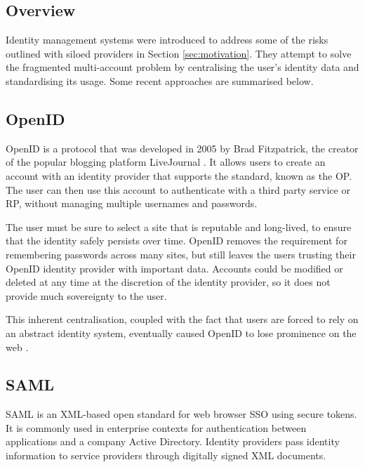 \subsection{Overview}
Identity management systems were introduced to address some of the risks outlined with siloed providers in Section \ref{sec:motivation}. They attempt to solve the fragmented multi-account problem by centralising the user's identity data and standardising its usage. Some recent approaches are summarised below.

\subsection{OpenID}
OpenID is a protocol that was developed in 2005 by Brad Fitzpatrick, the creator of the popular blogging platform LiveJournal \cite{fitzpatrick_distributed_2005}.
It allows users to create an account with an identity provider that supports the standard, known as the \ac{OP}. The user can then use this account to authenticate with a third party service or \ac{RP}, without managing multiple usernames and passwords.

The user must be sure to select a site that is reputable and long-lived, to ensure that the identity safely persists over time. OpenID removes the requirement for remembering passwords across many sites, but still leaves the users trusting their OpenID identity provider with important data. Accounts could be modified or deleted at any time at the discretion of the identity provider, so it does not provide much sovereignty to the user.

This inherent centralisation, coupled with the fact that users are forced to rely on an abstract identity system, eventually caused OpenID to lose prominence on the web \cite{gilbertson_openid:_2011}.

\subsection{SAML}
\ac{SAML} \cite{oasis_security_services_saml_2005} is an XML-based open standard for web browser \ac{SSO} using secure tokens. It is commonly used in enterprise contexts for authentication between applications and a company Active Directory. Identity providers pass identity information to service providers through digitally signed XML documents.

